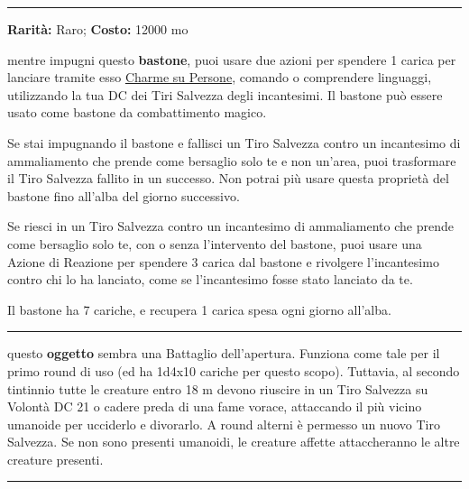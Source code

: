 \begin{multicols}{2}
\smallskip\noindent\rule{\linewidth}{2pt}  \hypertarget{BastonedelloCharme}{}\smallskip{}\noindent\label{BastonedelloCharme}

\textbf{Rarità:} Raro; \textbf{Costo:} 12000 mo

mentre impugni questo \textbf{bastone}, puoi usare due azioni per spendere 1 carica per lanciare tramite esso \hyperlink{Charme su Persone}{Charme su Persone}, comando o comprendere linguaggi, utilizzando la tua DC dei Tiri Salvezza degli incantesimi. Il bastone può essere usato come bastone da combattimento magico.

Se stai impugnando il bastone e fallisci un Tiro Salvezza contro un incantesimo di ammaliamento che prende come bersaglio solo te e non un'area, puoi trasformare il Tiro Salvezza fallito in un successo. Non potrai più usare questa proprietà del bastone fino all'alba del giorno successivo.

Se riesci in un Tiro Salvezza contro un incantesimo di ammaliamento che prende come bersaglio solo te, con o senza l'intervento del bastone, puoi usare una Azione di Reazione per spendere 3 carica dal bastone e rivolgere l'incantesimo contro chi lo ha lanciato, come se l'incantesimo fosse stato lanciato da te.

Il bastone ha 7 cariche, e recupera 1 carica spesa ogni giorno all'alba.

\smallskip\noindent\rule{\linewidth}{2pt}  \hypertarget{BattagliodelCannibalismo}{}\smallskip{}\noindent\label{BattagliodelCannibalismo}

questo \textbf{oggetto} sembra una Battaglio dell'apertura. Funziona come tale per il primo round di uso (ed ha 1d4x10 cariche per questo scopo). Tuttavia, al secondo tintinnio tutte le creature entro 18 m devono riuscire in un Tiro Salvezza su Volontà DC 21 o cadere preda di una fame vorace, attaccando il più vicino umanoide per ucciderlo e divorarlo. A round alterni è permesso un nuovo Tiro Salvezza. Se non sono presenti umanoidi, le creature affette attaccheranno le altre creature presenti.

\smallskip\noindent\rule{\linewidth}{2pt}  \hypertarget{Battagliodell'Apertura}{}\smallskip{}\noindent\label{Battagliodell'Apertura}


\end{multicols}
